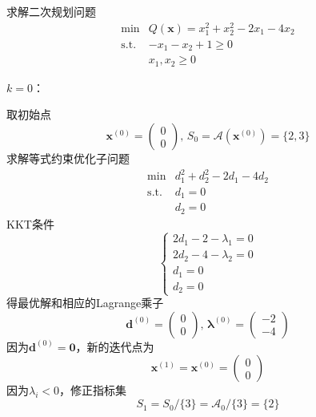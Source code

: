 \begin{example}
    求解二次规划问题
    \begin{equation}\label{eq:hand-calculation}
        \begin{array}{rl}
            \operatorname*{min} & Q(\boldsymbol{x})=x_{1}^{2}+x_{2}^{2}-2x_{1}-4x_{2}\\
            \mathrm{s.t.}&-x_{1}-x_{2}+1\geqslant0\\
            &x_{1},x_{2}\geqslant 0
        \end{array}
    \end{equation}
    \begin{solution}
        \colorbox{cyan!50}{$k = 0$：}

        取初始点
        \[
            \boldsymbol{x}^{(0)}=\begin{pmatrix}0\\0\end{pmatrix},\, S_0=\mathcal{A}(\boldsymbol{x}^{(0)})=\{2,3\}
        \]
        求解等式约束优化子问题
        \[
            \begin{array}{rl}
                \min & d_{1}^{2}+d_{2}^{2}-2d_{1}-4d_{2}\\
                \mathrm{s.t.} & d_{1}=0\\
                & d_{2}=0
            \end{array}
        \]
        KKT条件
        \[
            \left\{
                \begin{array}{l}
                    2d_1-2-\lambda_1 = 0\\
                    2d_2-4-\lambda_2 = 0\\
                    d_1 = 0\\
                    d_2 = 0
                \end{array}
            \right.
        \]
        得最优解和相应的Lagrange乘子
        \[
            \boldsymbol{d}^{(0)}=\begin{pmatrix}0\\0\end{pmatrix},\,
            \boldsymbol{\lambda}^{(0)}=\begin{pmatrix}-2\\-4\end{pmatrix}
        \]
        因为$\boldsymbol{d}^{(0)} = \boldsymbol{0}$，新的迭代点为
        \[
            \boldsymbol{x}^{(1)}= \boldsymbol{x}^{(0)} = \begin{pmatrix}0\\0\end{pmatrix}
        \]
        因为$\lambda_{i} <0$，修正指标集
        \[
            S_1=S_0/\{3\}=\mathcal{A}_0/\{3\}=\{2\}
        \]


\end{solution}
\end{example}
